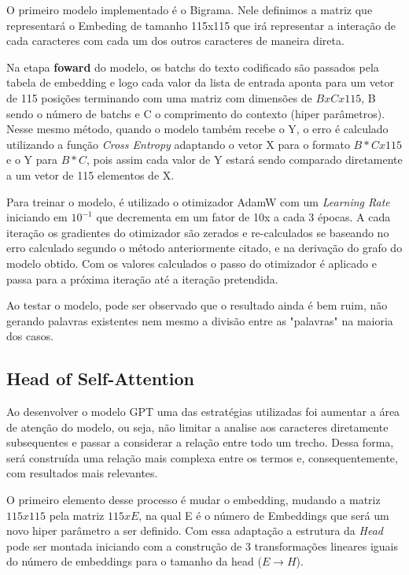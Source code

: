 \documentclass[9pt,technote]{IEEEtran}
\begin{document}
O primeiro modelo implementado é o Bigrama. Nele definimos a matriz que representará o Embeding de tamanho 115x115 que irá representar a interação de cada caracteres com cada um dos outros caracteres de maneira direta.

Na etapa \textbf{foward} do modelo, os batchs do texto codificado são passados pela tabela de embedding e logo cada valor da lista de entrada aponta para um vetor de 115 posições terminando com uma matriz com dimensões de $BxCx115$, B sendo o número de batchs e C o comprimento do contexto (hiper parâmetros). Nesse mesmo método, quando o modelo também recebe o Y, o erro é calculado utilizando a função \textit{Cross Entropy} adaptando o vetor X para o formato $B*C x 115$ e o Y para $B*C$, pois assim cada valor de Y estará sendo comparado diretamente a um vetor de 115 elementos de X.

Para treinar o modelo, é utilizado o otimizador AdamW com um \textit{Learning Rate} iniciando em $10^{-1}$ que decrementa em um fator de 10x a cada 3 épocas. A cada iteração os gradientes do otimizador são zerados e re-calculados se baseando no erro calculado segundo o método anteriormente citado, e na derivação do grafo do modelo obtido. Com os valores calculados o passo do otimizador é aplicado e passa para a próxima iteração até a iteração pretendida.

Ao testar o modelo, pode ser observado que o resultado ainda é bem ruim, não gerando palavras existentes nem mesmo a divisão entre as "palavras" na maioria dos casos.

\subsection{Head of Self-Attention}
Ao desenvolver o modelo GPT uma das estratégias utilizadas foi aumentar a área de atenção do modelo, ou seja, não limitar a analise aos caracteres diretamente subsequentes e passar a considerar a relação entre todo um trecho. Dessa forma, será construída uma relação mais complexa entre os termos e, consequentemente, com resultados mais relevantes. \cite{Attention_Is_All_You_Need}

O primeiro elemento desse processo é mudar o embedding, mudando a matriz $115x115$ pela matriz $115xE$, na qual E é o número de Embeddings que será um novo hiper parâmetro a ser definido. Com essa adaptação a estrutura da \textit{Head} pode ser montada iniciando com a construção de 3 transformações lineares iguais do número de embeddings para o tamanho da head ($E \rightarrow H$).
\end{document}
